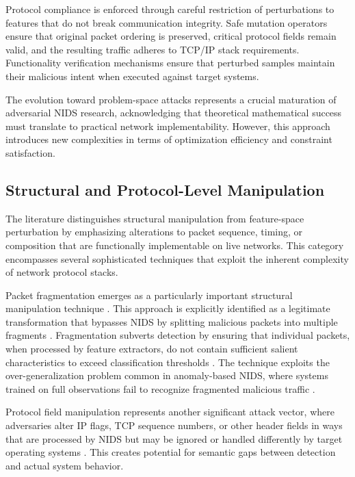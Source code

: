 Protocol compliance is enforced through careful restriction of perturbations to features that do not break communication integrity. Safe mutation operators ensure that original packet ordering is preserved, critical protocol fields remain valid, and the resulting traffic adheres to TCP/IP stack requirements. Functionality verification mechanisms ensure that perturbed samples maintain their malicious intent when executed against target systems.

The evolution toward problem-space attacks represents a crucial maturation of adversarial NIDS research, acknowledging that theoretical mathematical success must translate to practical network implementability. However, this approach introduces new complexities in terms of optimization efficiency and constraint satisfaction.

\subsection{Structural and Protocol-Level Manipulation}

The literature distinguishes structural manipulation from feature-space perturbation by emphasizing alterations to packet sequence, timing, or composition that are functionally implementable on live networks. This category encompasses several sophisticated techniques that exploit the inherent complexity of network protocol stacks.

Packet fragmentation emerges as a particularly important structural manipulation technique \cite{enhancing2023robustness}. This approach is explicitly identified as a legitimate transformation that bypasses NIDS by splitting malicious packets into multiple fragments \cite{enhancing2023robustness}. Fragmentation subverts detection by ensuring that individual packets, when processed by feature extractors, do not contain sufficient salient characteristics to exceed classification thresholds \cite{enhancing2023robustness}. The technique exploits the over-generalization problem common in anomaly-based NIDS, where systems trained on full observations fail to recognize fragmented malicious traffic \cite{enhancing2023robustness}.

Protocol field manipulation represents another significant attack vector, where adversaries alter IP flags, TCP sequence numbers, or other header fields in ways that are processed by NIDS but may be ignored or handled differently by target operating systems \cite{enhancing2023robustness}. This creates potential for semantic gaps between detection and actual system behavior.


